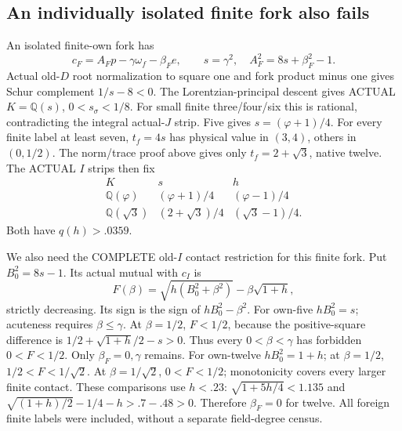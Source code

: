 \documentclass[11pt]{article}
\begin{document}
\subsection{An individually isolated finite fork also fails}
\label{app:arithD16Ifiniteisolated}

An isolated finite-own fork has
\[
       c_F=A_Fp-\gamma\omega_f-\beta_Fe,\qquad
       s=\gamma^2,\quad A_F^2=8s+\beta_F^2-1 .
\]
Actual old-\(D\) root normalization
to square one and fork product minus
one gives Schur complement \(1/s-8<0\).
The Lorentzian-principal descent gives
ACTUAL \(K=\mathbb Q(s)\),
\(0<s_\sigma<1/8\).
For small finite three/four/six this
is rational, contradicting the integral
actual-\(J\) strip.
Five gives \(s=(\varphi+1)/4\).
For every finite label at least seven,
\(t_f=4s\) has physical value in
\((3,4)\), others in \((0,1/2)\).
The norm/trace proof above gives only
\(t_f=2+\sqrt3\), native twelve.
The ACTUAL \(I\) strips then fix
\[
\begin{array}{c|c|c}
 K&s&h\\ \hline
 \mathbb Q(\varphi)&(\varphi+1)/4&(\varphi-1)/4\\
 \mathbb Q(\sqrt3)&(2+\sqrt3)/4&(\sqrt3-1)/4 .
\end{array}
\]
Both have \(q(h)>.0359\).

We also need the COMPLETE old-\(I\)
contact restriction for this finite fork.
Put \(B_0^2=8s-1\).
Its actual mutual with \(c_I\) is
\[
                 F(\beta)=\sqrt{h(B_0^2+\beta^2)}
                                          -\beta\sqrt{1+h},
\]
strictly decreasing.
Its sign is the sign of
\(hB_0^2-\beta^2\).
For own-five \(hB_0^2=s\);
acuteness requires \(\beta\le\gamma\).
At \(\beta=1/2\),
\(F<1/2\), because the positive-square
difference is
\(1/2+\sqrt{1+h}/2-s>0\).
Thus every \(0<\beta<\gamma\) has
forbidden \(0<F<1/2\).
Only \(\beta_F=0,\gamma\) remains.
For own-twelve \(hB_0^2=1+h\);
at \(\beta=1/2\), \(1/2<F<1/\sqrt2\).
At \(\beta=1/\sqrt2\), \(0<F<1/2\);
monotonicity covers every larger finite
contact.
These comparisons use \(h<.23\):
\(\sqrt{1+5h/4}<1.135\) and
\(\sqrt{(1+h)/2}-1/4-h>.7-.48>0\).
Therefore \(\beta_F=0\) for twelve.
All foreign finite labels were included,
without a separate field-degree census.
\end{document}
